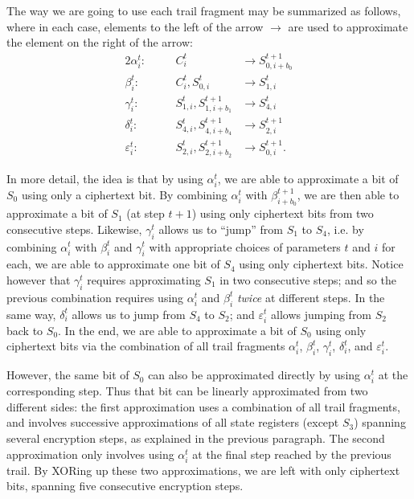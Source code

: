 The way we are going to use each trail fragment may be summarized as follows, where in each case, elements to the left of the arrow $\to$ are used to approximate the element on the right of the arrow:
\begin{alignat*}{2}
\alpha^t_i:\quad&& C^t_i &\to S^{t+1}_{0,i+b_0} \\
\beta^t_i:\quad&& C^t_i, S^t_{0,i} &\to S^t_{1,i} \\
\gamma^t_i:\quad&& S^t_{1,i}, S^{t+1}_{1,i+b_1} &\to S^t_{4,i} \\
\delta^t_i:\quad&& S^t_{4,i}, S^{t+1}_{4,i+b_4} &\to S^{t+1}_{2,i} \\
\varepsilon^t_i:\quad&& S^t_{2,i}, S^{t+1}_{2,i+b_2} &\to S^{t+1}_{0,i}.
\end{alignat*}

In more detail, the idea is that by using $\alpha^t_i$, we are able to approximate a bit of $S_0$ using only a ciphertext bit. By combining $\alpha^t_i$ with $\beta^{t+1}_{i+b_0}$, we are then able to approximate a bit of $S_1$ (at step $t+1$) using only ciphertext bits from two consecutive steps. Likewise, $\gamma^t_i$ allows us to ``jump'' from $S_1$ to $S_4$, i.e. by combining $\alpha^t_i$ with $\beta^t_i$ and $\gamma^t_i$ with appropriate choices of parameters $t$ and $i$ for each, we are able to approximate one bit of $S_4$ using only ciphertext bits. Notice however that $\gamma^t_i$ requires approximating $S_1$ in two consecutive steps; and so the previous combination requires using $\alpha^t_i$ and $\beta^t_i$ \emph{twice} at different steps. In the same way, $\delta^t_i$ allows us to jump from $S_4$ to $S_2$; and $\varepsilon^t_i$ allows jumping from $S_2$ back to $S_0$. In the end, we are able to approximate a bit of $S_0$ using only ciphertext bits via the combination of all trail fragments $\alpha^t_i$, $\beta^t_i$, $\gamma^t_i$, $\delta^t_i$, and $\varepsilon^t_i$.

However, the same bit of $S_0$ can also be approximated directly by using $\alpha^t_i$ at the corresponding step. Thus that bit can be linearly approximated from two different sides: the first approximation uses a combination of all trail fragments, and involves successive approximations of all state registers (except $S_3$) spanning several encryption steps, as explained in the previous paragraph. The second approximation only involves using $\alpha^t_i$ at the final step reached by the previous trail. By XORing up these two approximations, we are left with only ciphertext bits, spanning five consecutive encryption steps.

